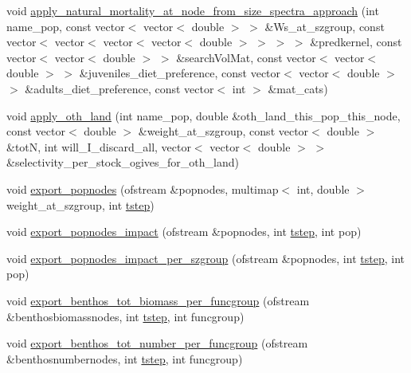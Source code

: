 \begin{DoxyCompactItemize}
\item 
void \mbox{\hyperlink{class_node_adba706d932c6e61ba0304608f84e17fe}{apply\+\_\+natural\+\_\+mortality\+\_\+at\+\_\+node\+\_\+from\+\_\+size\+\_\+spectra\+\_\+approach}} (int name\+\_\+pop, const vector$<$ vector$<$ double $>$ $>$ \&Ws\+\_\+at\+\_\+szgroup, const vector$<$ vector$<$ vector$<$ vector$<$ double $>$ $>$ $>$ $>$ \&predkernel, const vector$<$ vector$<$ double $>$ $>$ \&search\+Vol\+Mat, const vector$<$ vector$<$ double $>$ $>$ \&juveniles\+\_\+diet\+\_\+preference, const vector$<$ vector$<$ double $>$ $>$ \&adults\+\_\+diet\+\_\+preference, const vector$<$ int $>$ \&mat\+\_\+cats)
\item 
void \mbox{\hyperlink{class_node_a95a3d109bb71d0ef163a9fbf002a9043}{apply\+\_\+oth\+\_\+land}} (int name\+\_\+pop, double \&oth\+\_\+land\+\_\+this\+\_\+pop\+\_\+this\+\_\+node, const vector$<$ double $>$ \&weight\+\_\+at\+\_\+szgroup, const vector$<$ double $>$ \&totN, int will\+\_\+\+I\+\_\+discard\+\_\+all, vector$<$ vector$<$ double $>$ $>$ \&selectivity\+\_\+per\+\_\+stock\+\_\+ogives\+\_\+for\+\_\+oth\+\_\+land)
\item 
void \mbox{\hyperlink{class_node_aa97423b8f06b5a82eafa9244c8e72997}{export\+\_\+popnodes}} (ofstream \&popnodes, multimap$<$ int, double $>$ weight\+\_\+at\+\_\+szgroup, int \mbox{\hyperlink{thread__vessels_8cpp_a84bc73d278de929ec9974e1a95d9b23a}{tstep}})
\item 
void \mbox{\hyperlink{class_node_a85e68dd40198e604fa25f73354d90c3a}{export\+\_\+popnodes\+\_\+impact}} (ofstream \&popnodes, int \mbox{\hyperlink{thread__vessels_8cpp_a84bc73d278de929ec9974e1a95d9b23a}{tstep}}, int pop)
\item 
void \mbox{\hyperlink{class_node_a9a975577423e8eee727df5ceef3c0c08}{export\+\_\+popnodes\+\_\+impact\+\_\+per\+\_\+szgroup}} (ofstream \&popnodes, int \mbox{\hyperlink{thread__vessels_8cpp_a84bc73d278de929ec9974e1a95d9b23a}{tstep}}, int pop)
\item 
void \mbox{\hyperlink{class_node_a9fca246f7ce5d416df2013bc65076dc8}{export\+\_\+benthos\+\_\+tot\+\_\+biomass\+\_\+per\+\_\+funcgroup}} (ofstream \&benthosbiomassnodes, int \mbox{\hyperlink{thread__vessels_8cpp_a84bc73d278de929ec9974e1a95d9b23a}{tstep}}, int funcgroup)
\item 
void \mbox{\hyperlink{class_node_ade1464838d4a17ff84c956002b891322}{export\+\_\+benthos\+\_\+tot\+\_\+number\+\_\+per\+\_\+funcgroup}} (ofstream \&benthosnumbernodes, int \mbox{\hyperlink{thread__vessels_8cpp_a84bc73d278de929ec9974e1a95d9b23a}{tstep}}, int funcgroup)

\end{DoxyCompactItemize}
